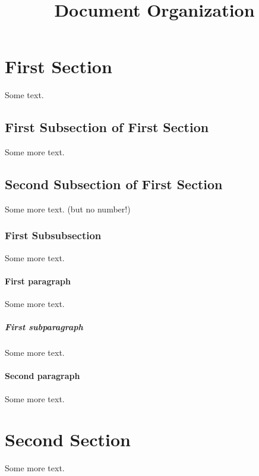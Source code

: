 \documentclass{article}
\title{Document Organization}
\begin{document}
\maketitle

\tableofcontents

\section{First Section}
Some text.

\subsection{First Subsection of First Section}
Some more text.

\subsection*{Second Subsection of First Section}
Some more text. (but no number!)

\subsubsection{First Subsubsection}
Some more text.

\paragraph{First paragraph}
Some more text.

\subparagraph{First subparagraph}
Some more text.

\paragraph{Second paragraph}
Some more text.

\section{Second Section}
Some more text.
\end{document}
